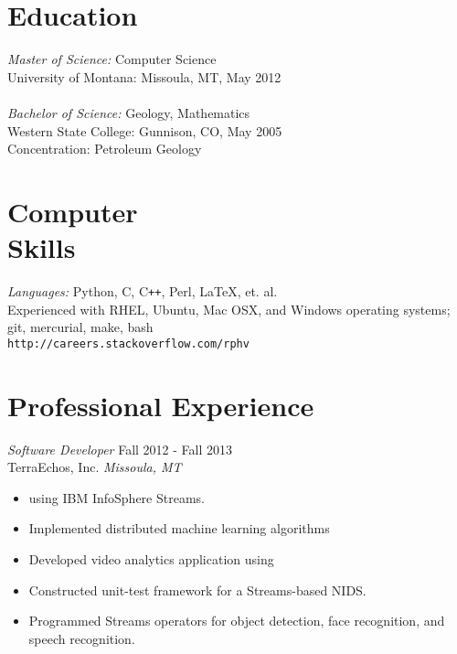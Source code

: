 \documentclass[line,margin]{res}
\begin{document}
\address{\texttt{perry@rphv.net} | 317.695.9860  }
\address{116 Strand Avenue, Missoula, MT 59801}

 
\begin{resume}
 
 
\section{\sc Education} 
        {\sl Master of Science:} Computer Science\\
        University of Montana: Missoula, MT, May 2012\\
        \\
        {\sl Bachelor of Science:} Geology, Mathematics \\
        Western State College: Gunnison, CO, May 2005 \\
        Concentration: Petroleum Geology
 
\section{\sc Computer \\ Skills} {\sl Languages:} Python, C, C\verb!++!, Perl, \LaTeX, et. al.\\
        Experienced with RHEL, Ubuntu, Mac OSX, and Windows operating systems; git, mercurial, make, bash  \\
        \texttt{http://careers.stackoverflow.com/rphv}

\section{\sc Professional Experience} 
        {\sl Software Developer} \hfill  Fall 2012 - Fall 2013\\
        TerraEchos, Inc. \hfill {\sl Missoula, MT}
        \begin{itemize} \itemsep -2pt
            \item using IBM\textsuperscript{\textregistered} InfoSphere Streams.
            \item Implemented distributed machine learning algorithms 
            \item Developed video analytics application using 
            \item Constructed unit-test framework for a Streams-based NIDS.
            \item Programmed Streams operators for object detection, face recognition, and speech recognition.  
        \end{itemize}


\end{resume}
\end{document}
